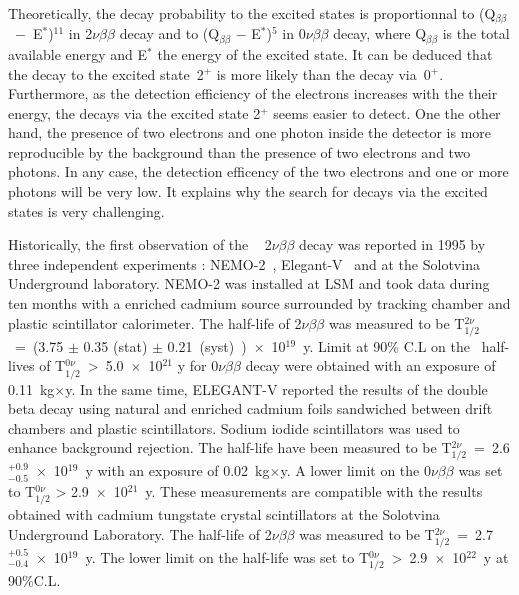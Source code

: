 \documentclass[main.tex]{subfiles}
\begin{document}
\NI Theoretically, the decay probability to the excited states is proportionnal to (Q$_{\beta\beta}$~$-$~E$^*$)$^{\text{11}}$ in 2$\nu\beta\beta$ decay and to (Q$_{\beta\beta}$ $-$ E$^*$)$^{\text{5}}$ in 0$\nu\beta\beta$ decay, where Q$_{\beta\beta}$ is the total available energy and E$^*$ the energy of the excited state. It can be deduced that the decay to the excited state~2$^+$ is more likely than the decay via~0$^+$. Furthermore, as the detection efficiency of the electrons increases with the their energy, the decays via the excited state 2$^+$ seems easier to detect. One the other hand, the presence of two electrons and one photon inside the detector is more reproducible by the background than the presence of two electrons and two photons. In any case, the detection efficency of the two electrons and one or more photons will be very low. It explains why the search for decays via the excited states is very challenging.


\bigskip


\NI Historically, the first observation of the \Cd~ 2$\nu\beta\beta$ decay was reported in 1995 by three independent experiments : NEMO-2~\cite{Barabash2010ie}, Elegant-V~\cite{ElegantV-1} and at the Solotvina Underground laboratory\cite{Aurora}. NEMO-2 was installed at LSM and took data during ten months with a enriched cadmium source surrounded by tracking chamber and plastic scintillator calorimeter. The half-life of 2$\nu\beta\beta$ was measured to be T$_{\text{1}/\text{2}}^{\text{2}\nu}$~=~(3.75 $\pm$ 0.35 (stat) $\pm$ 0.21~(syst)~)~$\times$~10$^{\text{19}}$~y. Limit at 90\% C.L on the \Cd~half-lives of T$_{\text{1}/\text{2}}^{\text{0}\nu}$~>~5.0~$\times$~10$^{\text{21}}$ y for 0$\nu\beta\beta$ decay were obtained with an exposure of 0.11~kg$\times$y. In the same time, ELEGANT-V reported the results of the double beta decay using natural and enriched cadmium foils sandwiched between drift chambers and plastic scintillators. Sodium iodide scintillators was used to enhance background rejection. The half-life have been measured to be T$_{\text{1}/\text{2}}^{\text{2}\nu}$~=~2.6 $^{+\text{0.9}}_{-\text{0.5}}$~$\times$~10$^{\text{19}}$~y with an exposure of 0.02~kg$\times$y. A lower limit on the 0$\nu\beta\beta$ was set to T$_{\text{1}/\text{2}}^{\text{0}\nu}$ > 2.9~$\times$~10$^{\text{21}}$~y. These measurements are compatible with the results obtained with cadmium tungstate crystal scintillators at the Solotvina Underground Laboratory.  The half-life of 2$\nu\beta\beta$ was measured to be T$_{\text{1}/\text{2}}^{\text{2}\nu}$~=~2.7$^{+\text{0.5}}_{-\text{0.4}}$~$\times$~10$^{\text{19}}$~y. The lower limit on the half-life was set to T$_{\text{1}/\text{2}}^{\text{0}\nu}$~>~2.9~$\times$~10$^{\text{22}}$~y at 90\%C.L. 
\end{document}
